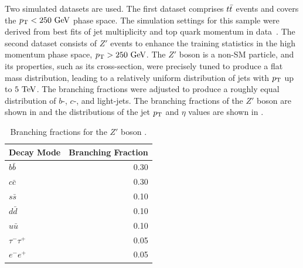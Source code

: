 Two simulated datasets are used.
The first dataset comprises $t\bar{t}$ events and covers the $\pt < 250~\GeV$ phase space.
The simulation settings for this sample were derived from best fits of jet multiplicity and top quark momentum in data~\cite{ttbar1, ttbar2}.
The second dataset consists of $Z'$ events to enhance the training statistics in the high momentum phase space, $\pt > 250~\GeV$.
The $Z'$ boson is a non-SM particle, and its properties, such as its cross-section, were precisely tuned to produce a flat mass distribution, leading to a relatively uniform distribution of jets with $p_{\text{T}}$ up to $5~\TeV$.
The branching fractions were adjusted to produce a roughly equal distribution of $b$-, $c$-, and light-jets.
The branching fractions of the $Z'$ boson are shown in  and the distributions of the jet $p_{\text{T}}$ and $\eta$ values are shown in .

\begin{table}[ht]
    \centering
    \begin{tabular}{lr}
        \toprule
        Decay Mode & Branching Fraction \\
        \midrule
        $b\bar{b}$ & 0.30 \\
        $c\bar{c}$ & 0.30 \\
        $s\bar{s}$ & 0.10 \\
        $d\bar{d}$ & 0.10 \\
        $u\bar{u}$ & 0.10 \\
        $\tau^-\tau^+$ & 0.05 \\
        $e^-e^+$ & 0.05 \\
        \bottomrule
    \end{tabular}
    \caption{Branching fractions for the $Z'$ boson \cite{Run2FTAlgs}.}
    \label{tab:zprime_branching}
\end{table}

